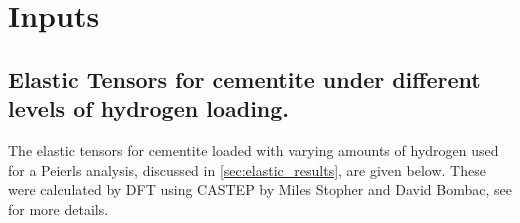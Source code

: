 \chapter{Inputs}

\section{Elastic Tensors for cementite under different levels of hydrogen loading.}
\label{sec:elastic_tensors}

The elastic tensors for cementite loaded with varying amounts of hydrogen used for a Peierls analysis, discussed in \autoref{sec:elastic_results}, are given below. These were calculated by DFT using CASTEP \cite{Clark2005} by Miles Stopher and David Bombac, see \cite{Stopher2017} for more details. 

